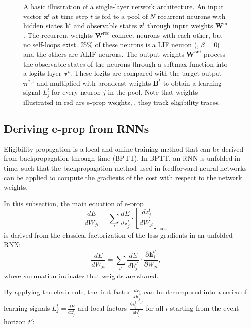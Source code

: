\begin{figure}[!ht]
            \caption[Single-layer illustration.]{A basic illustration of a single-layer network architecture.
            An input vector $\mathbf{x}^t$ at time step $t$ is fed to a pool of $N$ recurrent neurons with hidden states $\mathbf{h}^t$ and observable states $\mathbf{z}^t$ through input weights $\mathbf{W}^\text{in}$. The recurrent weights $\mathbf{W}^\text{rec}$ connect neurons with each other, but no self-loops exist. 25\% of these neurons is a LIF neuron (\ie, $\beta = 0$) and the others are ALIF neurons. The output weights $\mathbf{W}^\text{out}$ process the observable states of the neurons through a softmax function into a logits layer $\mathbf{\pi}^t$. These logits are compared with the target output $\mathbf{\pi}^{*, t}$ and multiplied with broadcast weights $\mathbf{B}^t$ to obtain a learning signal $L_j^t$ for every neuron $j$ in the pool.
            Note that weights illustrated in red are e-prop weights, \ie, they track eligibility traces.}
            \label{fig:topology-sl}
          \end{figure}


    \subsection{Deriving e-prop from RNNs}\label{sec:derivefromBPTT}
        Eligibility propagation is a local and online training method that can be derived from backpropagation through time (BPTT).
        In BPTT, an RNN is unfolded in time, such that the backpropagation method used in feedforward neural networks can be applied to compute the gradients of the cost with respect to the network weights.

        In this subsection, the main equation of e-prop
        \begin{equation}
        \frac{dE}{dW_{ji}} =
        \sum_t\frac{dE}{dz_j^t}\cdot\left[\frac{dz_j^t}{dW_{ji}}\right]_\text{local}
        \end{equation}
        is derived from the classical factorization of the loss gradients in an unfolded RNN:
        \begin{equation}\label{eq:clafac}
        \frac{dE}{dW_{ji}} = \sum_{t'}\frac{dE}{d\mathbf{h}_j^{t'}}\cdot\frac{\partial \mathbf{h}_j^{t'}}{\partial W_{ji}},
        \end{equation}
        where summation indicates that weights are shared.

        By applying the chain rule, the first factor $\frac{dE}{d\mathbf{h}_j^{t'}}$ can be decomposed into a series of learning signals $L_j^t = \frac{dE}{dz_j^t}$ and local factors $\frac{\partial\mathbf{h}_j^{t-t'}}{\partial\mathbf{h}_j^t}$ for all $t$ starting from the event horizon $t'$:

